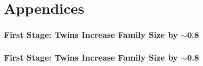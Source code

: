 \documentclass[9pt,letterpaper,subeqn]{beamer}
\begin{document}
\frame{

}



\section{Appendices}
\frame{
\begin{center}
\Large \textcolor{blue}{Appendices}
\end{center}
}

\frame{
\begin{center}
\Large \textcolor{blue}{Appendix Tables}
\end{center}
}

\begin{frame}[label=Fstage]
\frametitle{First Stage: Twins Increase Family Size by $\sim$0.8}

\hyperlink{FS1}{}
\end{frame}

\begin{frame}[label=Fstage2]
\frametitle{First Stage: Twins Increase Family Size by $\sim$0.8}

\hyperlink{IV}{}
\end{frame}

 \begin{frame}[label=Spain1]

\hyperlink{c}{}
\end{frame}

 \begin{frame}[label=Brazil]

\hyperlink{c}{}
\end{frame}

\begin{frame}[label=Sweden]

\hyperlink{c}{}
\end{frame}

\begin{frame}

\hyperlink{c}{}
\end{frame}
\end{document}
